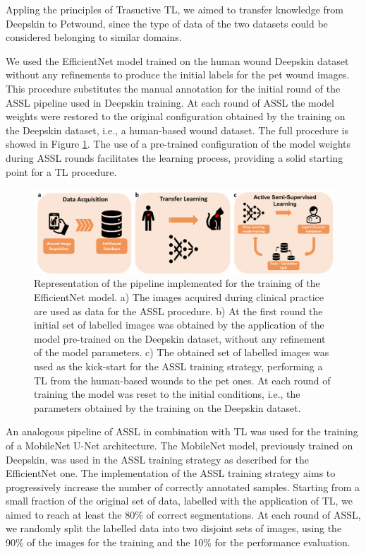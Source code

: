 \documentclass[../main.tex]{subfiles}
\begin{document}
Appling the principles of Trasuctive TL, we aimed to transfer knowledge from Deepskin to Petwound, since the type of data of the two datasets could be considered belonging to similar domains.

We used the EfficientNet model trained on the human wound Deepskin dataset without any refinements to produce the initial labels for the pet wound images. 
This procedure substitutes the manual annotation for the initial round of the ASSL pipeline used in Deepskin training.
At each round of ASSL the model weights were restored to the original configuration obtained by the training on the Deepskin dataset, i.e., a human-based wound dataset.
The full procedure is showed in Figure \ref{fig:TASSL}.
The use of a pre-trained configuration of the model weights during ASSL rounds facilitates the learning process, providing a solid starting point for a TL procedure. 

\begin{figure}[H] 
\begin{center}
\includegraphics[width=16cm]{images/TASSL.png}
\caption{\small{Representation of the pipeline implemented for the training of the EfficientNet model.
a) The images acquired during clinical practice are used as data for the ASSL procedure.
b) At the first round the initial set of labelled images was obtained by the application of the model pre-trained on the Deepskin dataset, without any refinement of the model parameters.
c) The obtained set of labelled images was used as the kick-start for the ASSL training strategy, performing a TL from the human-based wounds to the pet ones. 
At each round of training the model was reset to the initial conditions, i.e., the parameters obtained by the training on the Deepskin dataset.}}\label{fig:TASSL}
\end{center}
\end{figure}
An analogous pipeline of ASSL in combination with TL was used for the training of a MobileNet U-Net architecture. 
The MobileNet model, previously trained on Deepskin, was used in the ASSL training strategy as described for the EfficientNet one. 
The implementation of the ASSL training strategy aims to progressively increase the number of correctly annotated samples.
Starting from a small fraction  of the original set of data, labelled with the application of TL, we aimed to reach at least the 80\% of correct segmentations. 
At each round of ASSL, we randomly split the labelled data into two disjoint sets of images, using the 90\% of the images for the training and the 10\% for the performance evaluation.
\end{document}
